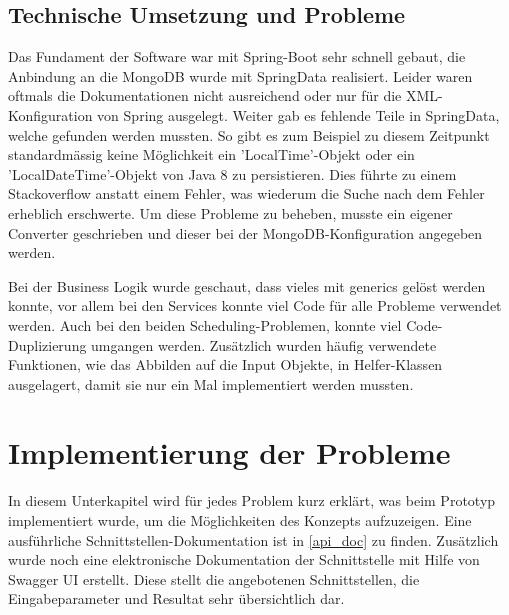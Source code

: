 \subsection{Technische Umsetzung und Probleme}
Das Fundament der Software war mit Spring-Boot \cite{spring_boot} sehr schnell gebaut, die Anbindung an die MongoDB wurde mit SpringData \cite{spring_data} realisiert. Leider waren 
oftmals die Dokumentationen nicht ausreichend oder nur für die XML-Konfiguration von Spring ausgelegt. Weiter gab es fehlende Teile in SpringData, welche gefunden werden mussten. 
So gibt es zum Beispiel zu diesem Zeitpunkt standardmässig keine Möglichkeit ein 'LocalTime'-Objekt oder ein 'LocalDateTime'-Objekt von Java 8 zu persistieren. Dies führte zu einem 
Stackoverflow anstatt einem Fehler, was wiederum die Suche nach dem Fehler erheblich erschwerte. Um diese Probleme zu beheben, musste ein eigener Converter geschrieben und dieser 
bei der MongoDB-Konfiguration angegeben werden.

Bei der Business Logik wurde geschaut, dass vieles mit \gls{generics} gelöst werden konnte, vor allem bei den Services konnte viel Code für alle Probleme verwendet werden. Auch 
bei den beiden Scheduling-Problemen, konnte viel Code-Duplizierung umgangen werden. Zusätzlich wurden häufig verwendete Funktionen, wie das Abbilden auf die Input Objekte, in 
Helfer-Klassen ausgelagert, damit sie nur ein Mal implementiert werden mussten.

\section{Implementierung der Probleme}\label{impl_problems}
In diesem Unterkapitel wird für jedes Problem kurz erklärt, was beim Prototyp implementiert wurde, um die Möglichkeiten des Konzepts aufzuzeigen. Eine ausführliche 
Schnittstellen-Dokumentation ist in \autoref{api_doc} zu finden. Zusätzlich wurde noch eine elektronische Dokumentation der Schnittstelle mit Hilfe von Swagger UI erstellt. Diese stellt die 
angebotenen Schnittstellen, die Eingabeparameter und Resultat sehr übersichtlich dar.

